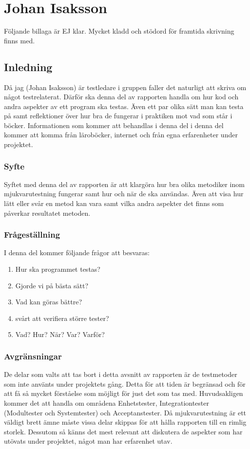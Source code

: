 \section{Johan Isaksson}
	Följande billaga är EJ klar. Mycket kladd och stödord för framtida skrivning finns med.
	\subsection{Inledning}
	Då jag (Johan Isaksson) är testledare i gruppen faller det naturligt att skriva om något testrelaterat. Därför ska denna del av rapporten handla om hur kod och andra aspekter av ett program ska testas. Även ett par olika sätt man kan testa på samt reflektioner över hur bra de fungerar i praktiken mot vad som står i böcker. Informationen som kommer att behandlas i denna del i denna del kommer att komma från läroböcker, internet och från egna erfarenheter under projektet. 
	
	
	\subsubsection{Syfte}
	Syftet med denna del av rapporten är att klargöra hur bra olika metodiker inom mjukvarutestning fungerar samt hur och när de ska användas. Även att visa hur lätt eller svår en metod kan vara samt vilka andra aspekter det finns som påverkar resultatet metoden.
	
	
	\subsubsection{Frågeställning}
	I denna del kommer följande frågor att besvaras:
	\begin{enumerate}
	\item{Hur ska programmet testas?}
	\item{Gjorde vi på bästa sätt?}
	\item{Vad kan göras bättre?}
	\item{svårt att verifiera större tester?}
	\item{Vad? Hur? När? Var? Varför?}	
	\end{enumerate}
	
	\subsubsection{Avgränsningar}
	De delar som valts att tas bort i detta avsnitt av rapporten är de testmetoder som inte använts under projektets gång. Detta för att tiden är begränsad och för att få så mycket förståelse som möjligt för just det som tas med. Huvudsakligen kommer det att handla om områdena Enhetstester, Integrationtester (Modultester och Systemtester) och Acceptanstester. \newline
	Då mjukvarutestning är ett väldigt brett ämne måste vissa delar skippas för att hålla rapporten till en rimlig storlek. Dessutom så känns det mest relevant att diskutera de aspekter som har utövats under projektet, något man har erfarenhet utav.
	
